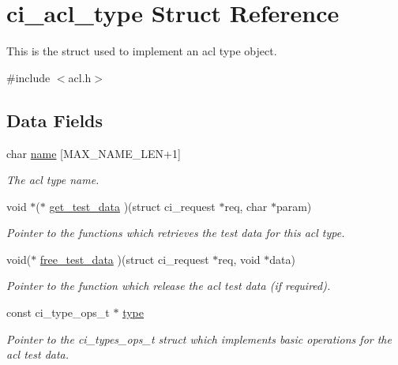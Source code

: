 \hypertarget{structci__acl__type}{
\section{ci\_\-acl\_\-type Struct Reference}
\label{structci__acl__type}
}


This is the struct used to implement an acl type object.  


{\ttfamily \#include $<$acl.h$>$}\subsection*{Data Fields}
\begin{DoxyCompactItemize}
\item 
\hypertarget{structci__acl__type_a0457e48491142bb11adf3b5cf915482f}{
char \hyperlink{structci__acl__type_a0457e48491142bb11adf3b5cf915482f}{name} \mbox{[}MAX\_\-NAME\_\-LEN+1\mbox{]}}
\label{structci__acl__type_a0457e48491142bb11adf3b5cf915482f}

\begin{DoxyCompactList}\small\item\em The acl type name. \item\end{DoxyCompactList}\item 
void $\ast$($\ast$ \hyperlink{structci__acl__type_a771cf49548b36b0b5ff45f87dab5dc18}{get\_\-test\_\-data} )(struct ci\_\-request $\ast$req, char $\ast$param)
\begin{DoxyCompactList}\small\item\em Pointer to the functions which retrieves the test data for this acl type. \item\end{DoxyCompactList}\item 
void($\ast$ \hyperlink{structci__acl__type_ac90a177b4f70ea783e2b19db81c71afe}{free\_\-test\_\-data} )(struct ci\_\-request $\ast$req, void $\ast$data)
\begin{DoxyCompactList}\small\item\em Pointer to the function which release the acl test data (if required). \item\end{DoxyCompactList}\item 
\hypertarget{structci__acl__type_aeb060f82fccb5bb426ae1c4cd785fc2e}{
const ci\_\-type\_\-ops\_\-t $\ast$ \hyperlink{structci__acl__type_aeb060f82fccb5bb426ae1c4cd785fc2e}{type}}
\label{structci__acl__type_aeb060f82fccb5bb426ae1c4cd785fc2e}

\begin{DoxyCompactList}\small\item\em Pointer to the ci\_\-types\_\-ops\_\-t struct which implements basic operations for the acl test data. \item\end{DoxyCompactList}\end{DoxyCompactItemize}



